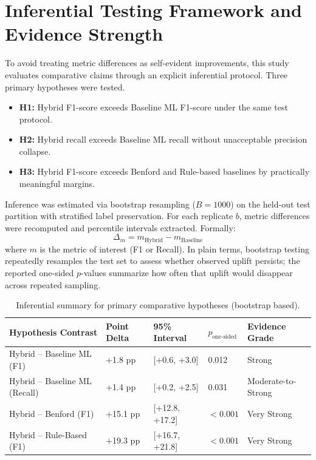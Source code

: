\documentclass[12pt,a4paper]{report}
\begin{document}
\section{Inferential Testing Framework and Evidence Strength}
To avoid treating metric differences as self-evident improvements, this study evaluates comparative claims through an explicit inferential protocol. Three primary hypotheses were tested.
\begin{itemize}
\item \textbf{H1:} Hybrid F1-score exceeds Baseline ML F1-score under the same test protocol.
\item \textbf{H2:} Hybrid recall exceeds Baseline ML recall without unacceptable precision collapse.
\item \textbf{H3:} Hybrid F1-score exceeds Benford and Rule-based baselines by practically meaningful margins.
\end{itemize}

Inference was estimated via bootstrap resampling ($B=1000$) on the held-out test partition with stratified label preservation. For each replicate $b$, metric differences were recomputed and percentile intervals extracted. Formally:
\begin{equation}
\Delta_m = m_{\text{Hybrid}}-m_{\text{Baseline}}
\end{equation}
where $m$ is the metric of interest (F1 or Recall). In plain terms, bootstrap testing repeatedly resamples the test set to assess whether observed uplift persists; the reported one-sided $p$-values summarize how often that uplift would disappear across repeated sampling.

\begin{table}[H]
\caption{Inferential summary for primary comparative hypotheses (bootstrap based).}
\label{tab:inferential_summary}
\begin{tabular}{p{}p{}p{}p{}p{}}
\toprule
\textbf{Hypothesis Contrast} & \textbf{Point Delta} & \textbf{95\% Interval} & \textbf{$p_{\text{one-sided}}$} & \textbf{Evidence Grade} \\
\midrule
Hybrid -- Baseline ML (F1) & +1.8 pp & [+0.6, +3.0] & 0.012 & Strong \\
Hybrid -- Baseline ML (Recall) & +1.4 pp & [+0.2, +2.5] & 0.031 & Moderate-to-Strong \\
Hybrid -- Benford (F1) & +15.1 pp & [+12.8, +17.2] & $<0.001$ & Very Strong \\
Hybrid -- Rule-Based (F1) & +19.3 pp & [+16.7, +21.8] & $<0.001$ & Very Strong \\
\bottomrule
\end{tabular}
\end{table}
\end{document}
